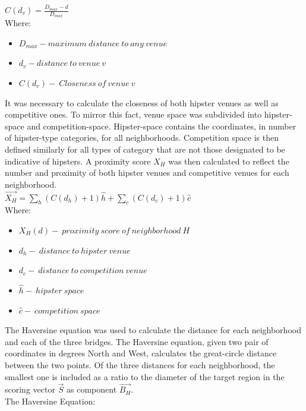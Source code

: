 \documentclass[12pt]{article}
\begin{document}
$\displaystyle{C(d_v) = \frac{D_{max} - d}{D_{max}}}$ \\

Where:
\begin{itemize}[noitemsep]
	\item	$D_{max} - maximum\ distance\ to\ any\ venue$
	\item	$d_v - distance\ to\ venue\ v$
	\item	$C(d_v) -\ Closeness\ of\ venue\ v$
\end{itemize}
		
	It was necessary to calculate the closeness of both hipster venues as well as competitive ones.
	To mirror this fact, venue space was subdivided into hipster-space and competition-space.
	Hipster-space contains the coordinates, in number of hipster-type categories, for all neighborhoods.
	Competition space is then defined similarly for all types of category that are not those designated to be indicative of hipsters.
	A proximity score $X_H$ was then calculated to reflect the number and proximity of both hipster venues and competitive venues for each neighborhood.\\

$\displaystyle{\vec{X_{H}} = \sum_{h}(C\left(d_{h}\right) + 1)\hat{h} + \sum_{c}(C\left(d_{c}\right) + 1)\hat{c}}$\\

Where:
\begin{itemize}[noitemsep]
	\item $X_{H}(d)-\ proximity\ score\ of\ neighborhood\ H$
	\item $d_h -\ distance\ to\ hipster\ venue$
	\item $d_c -\ distance\ to\ competition\ venue$
	\item $\hat{h} -\ hipster\ space$
	\item $\hat{c} -\ competition\ space$
\end{itemize}

	The Haversine equation was used to calculate the distance for each neighborhood and each of the three bridges.
	The Haversine equation, given two pair of coordinates in degrees North and West, calculates the great-circle distance between the two points.
	Of the three distances for each neighborhood, the smallest one is included as a ratio to the diameter of the target region in the scoring vector $\vec{S}$ as component $\vec{B_H}.$\\

	The Haversine Equation:\\
\end{document}
